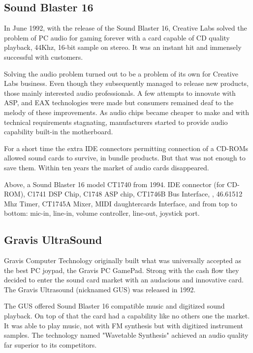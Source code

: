\subsection{Sound Blaster 16}
 In June 1992, with the release of the Sound Blaster 16, Creative Labs solved the problem of PC audio for gaming forever with a card capable of CD quality playback, 44Khz, 16-bit sample on stereo. It was an instant hit and immensely successful with customers.\\
\par
{}
\par
Solving the audio problem turned out to be a problem of its own for Creative Labs business. Even though they subsequently managed to release new products, those mainly interested audio professionals. A few attempts to innovate with ASP, and EAX technologies were made but consumers remained deaf to the melody of these improvements. As audio chips became cheaper to make and with technical requirements stagnating, manufacturers started to provide audio capability built-in the motherboard.\\
\par
For a short time the extra IDE connectors permitting connection of a CD-ROMs allowed sound cards to survive, in bundle products. But that was not enough to save them. Within ten years the market of audio cards disappeared.\\
\par
{}
\par
Above, a Sound Blaster 16 model CT1740 from 1994.  IDE connector (for CD-ROM),  C1741 DSP Chip,  C1748 ASP chip,  CT1746B Bus Interface, , 46.61512 Mhz Timer,  CT1745A Mixer,  MIDI daughtercards Interface, and  from top to bottom: mic-in, line-in, volume controller, line-out, joystick port.







\subsection{Gravis UltraSound}
Gravis Computer Technology originally built what was universally accepted as the best PC joypad, the Gravis PC GamePad. Strong with the cash flow they decided to enter the sound card market with an audacious and innovative card. The Gravis Ultrasound (nicknamed GUS) was released in 1992.\\
\par
The GUS offered Sound Blaster 16 compatible music and digitized sound playback. On top of that the card had a capability like no others one the market. It was able to play music, not with FM synthesis but with digitized instrument samples. The technology named "Wavetable Synthesis" achieved an audio quality far superior to its competitors.



